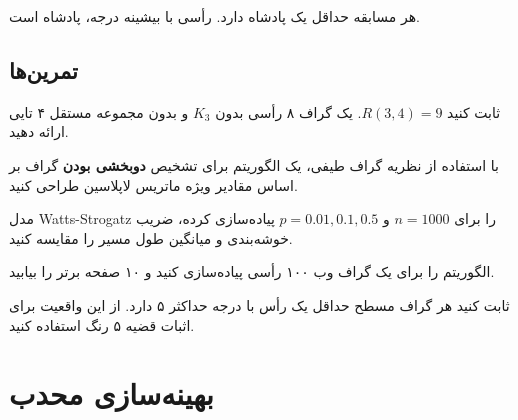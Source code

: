 \documentclass{matinbook}
\begin{document}
    \begin{theorem}
        هر مسابقه حداقل یک پادشاه دارد.
        رأسی با بیشینه درجه، پادشاه است.
        \label{thm:tournament-king}
    \end{theorem}
    
    \section{تمرین‌ها}
    
    \begin{exercise}
        ثابت کنید $R(3,4) = 9$.
        یک گراف ۸ رأسی بدون $K_{3}$ و
        بدون مجموعه مستقل ۴ تایی ارائه دهید.
        \label{exc:ramsey-34}
    \end{exercise}
    
    \begin{exercise}
        با استفاده از نظریه گراف طیفی،
        یک الگوریتم برای تشخیص
        \textbf{دوبخشی بودن} گراف
        بر اساس مقادیر ویژه ماتریس لاپلاسین
        طراحی کنید.
        \label{exc:spectral-bipartite}
    \end{exercise}
    
    \begin{exercise}
        مدل Watts-Strogatz را برای
        $n = 1000$ و $p = 0.01, 0.1, 0.5$
        پیاده‌سازی کرده، ضریب خوشه‌بندی
        و میانگین طول مسیر را مقایسه کنید.
        \label{exc:small-world}
    \end{exercise}
    
    \begin{exercise}
        الگوریتم  را برای
        یک گراف وب ۱۰۰ رأسی پیاده‌سازی کنید
        و ۱۰ صفحه برتر را بیابید.
        \label{exc:pagerank}
    \end{exercise}
    
    \begin{exercise}
        ثابت کنید هر گراف مسطح
        حداقل یک رأس با درجه حداکثر ۵ دارد.
        از این واقعیت برای اثبات
        قضیه ۵ رنگ استفاده کنید.
        \label{exc:five-color}
    \end{exercise}
    
    
    
    \chapter{بهینه‌سازی محدب}
    \label{chap:convex-optimization}
    
\end{document}
